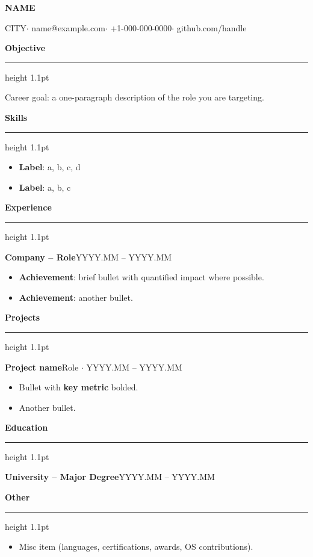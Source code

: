 \documentclass[11pt,a4paper]{article}
\makeatletter
\newcommand{\cvname}{NAME}
\newcommand{\cvlocation}{CITY}
\newcommand{\cvemail}{name@example.com}
\newcommand{\cvphone}{+1-000-000-0000}
\newcommand{\cvwebsite}{github.com/handle}
\newcommand{\cvobjective}{Career goal: a one-paragraph description of the role you are targeting.}
\newcommand{\cvsection}[1]{%
  \par\vspace{6pt}%
  {\noindent\bfseries\fontsize{12.5pt}{15pt}\selectfont #1}%
  \par\vspace{1pt}%
  {\color{cvrule}\hrule height 1.1pt}%
  \vspace{4pt}%
  \noindent\ignorespaces
}
\newcommand{\cventry}[2]{%
  \par\noindent
  {\bfseries #1}\hfill{\normalfont\color{cvtext}#2}%
  \par\vspace{2pt}%
}
\newcommand{\cvskill}[2]{%
  \item \textbf{#1}: #2
}
\makeatother
\begin{document}
\begin{center}
  {\bfseries\fontsize{20pt}{24pt}\selectfont \cvname}\par
  \vspace{4pt}
  {\small
    \cvlocation \quad $\cdot$ \quad
    \cvemail \quad $\cdot$ \quad
    \cvphone \quad $\cdot$ \quad
    \cvwebsite
  }
\end{center}


\vspace{6pt}

\cvsection{Objective}
\cvobjective

\cvsection{Skills}
\begin{itemize}
  \cvskill{Label}{a, b, c, d}
  \cvskill{Label}{a, b, c}
\end{itemize}

\cvsection{Experience}
\cventry{Company -- Role}{YYYY.MM -- YYYY.MM}
\begin{itemize}
  \item \textbf{Achievement}: brief bullet with quantified impact where possible.
  \item \textbf{Achievement}: another bullet.
\end{itemize}

\cvsection{Projects}
\cventry{Project name}{Role $\cdot$ YYYY.MM -- YYYY.MM}
\begin{itemize}
  \item Bullet with \textbf{key metric} bolded.
  \item Another bullet.
\end{itemize}

\cvsection{Education}
\cventry{University -- Major Degree}{YYYY.MM -- YYYY.MM}

\cvsection{Other}
\begin{itemize}
  \item Misc item (languages, certifications, awards, OS contributions).
\end{itemize}
\end{document}
